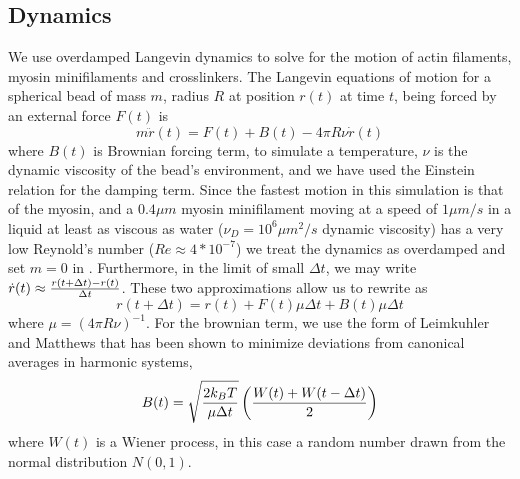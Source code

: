 \documentclass[12pt]{article}
\begin{document}
\subsection{Dynamics}
We use overdamped Langevin dynamics to solve for the motion of actin filaments, myosin minifilaments and crosslinkers.
The Langevin equations of motion for a spherical bead of
mass $m$, radius $R$ at position $r(t)$ at time $t$, being forced by an external force $F(t)$ is
\begin{equation}
  m\ddot{r}(t) = F(t) + B(t) - 4\pi R\nu \dot{r}(t)
  \label{eqn:lang}
\end{equation} 
where $B(t)$ is Brownian forcing term, to simulate a temperature, $\nu$ is the dynamic viscosity of the bead's
environment, and we have used the Einstein relation for the damping term.  
Since the fastest motion in this simulation is that of the myosin, and a $0.4\mu m$ myosin minifilament moving at
a speed of $1\mu m/s$ in a liquid at least as viscous as water ($\nu_D=10^6\mu m^2/s$ dynamic viscosity) has a very low Reynold's
number ($Re \approx 4*10^{-7}$) we treat the dynamics as overdamped and set $m=0$ in .
Furthermore, in the limit of small $\Delta t$, we may write $\dot{r}(t) \approx {r(t+\Delta t)-r(t)\over \Delta t}$. These two
approximations allow us to rewrite  as 
\begin{equation}  
  r(t+\Delta t) = r(t) + F(t)\mu \Delta t + B(t) \mu \Delta t
  \label{eqn:overdamped}
\end{equation}
where $\mu = (4\pi R\nu)^{-1}$. For the brownian term, we use the form of Leimkuhler and Matthews \cite{leimkuhler2013} that has
been shown to minimize deviations from canonical averages in harmonic systems,
\begin{equation}
  B(t)=\sqrt{2k_BT\over\mu \Delta t}\left({W(t)+W(t-\Delta t)\over2}\right)
  \label{eqn:baoab_brownian}
\end{equation} 
where $W(t)$ is a Wiener process, in this case a random number drawn from the normal distribution $N(0,1)$. 
\end{document}
